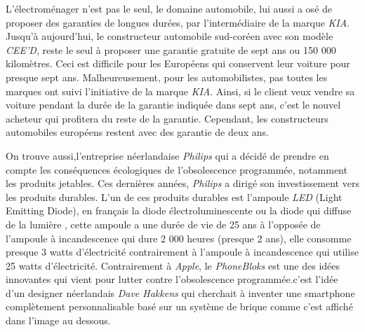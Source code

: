 \smallbreak
L’électroménager n'est pas le seul, le domaine automobile, lui aussi a osé de proposer  des garanties de longues durées, par l’intermédiaire de la marque \textit{KIA}. Jusqu’à aujourd'hui, le constructeur automobile sud-coréen avec son modèle \textit{CEE’D}, reste le seul à proposer une garantie gratuite de sept ans ou 150 000 kilomètres. Ceci est difficile pour les Européens qui conservent leur voiture pour presque sept ans. Malheureusement, pour les automobilistes, pas toutes les marques ont suivi l’initiative de la marque \textit{KIA}. Ainsi, si le client veux vendre sa voiture pendant la durée de la garantie indiquée dans sept ans, c'est le nouvel acheteur qui profitera du reste de la garantie. Cependant, les constructeurs automobiles européens restent avec des garantie de deux ans.


\smallbreak
On trouve aussi,l'entreprise néerlandaise \textit{Philips} qui a décidé de prendre en compte les conséquences écologiques de l'obsolescence programmée, notamment les produits jetables. Ces dernières années, \textit{Philips} a dirigé son investissement vers  les produits durables. L'un de ces produits durables est l’ampoule \textit{LED} (Light Emitting Diode), en français la diode électroluminescente ou la diode qui  diffuse de la lumière , cette ampoule a une durée de vie de 25 ans à l'opposée de l'ampoule à incandescence qui dure 2 000 heures (presque 2 ans), elle consomme presque 3 watts d’électricité contrairement à l'ampoule à incandescence qui utilise 25 watts d’électricité. 
\newpage
\smallbreak
Contrairement à \textit{Apple}, le \textit{PhoneBloks} est une des idées innovantes qui vient pour lutter contre l'obsolescence programmée.c'est l'idée d'un designer néerlandais \textit{Dave Hakkens} qui cherchait à inventer une smartphone complètement personnalisable basé sur un système de brique comme c'est affiché dans l'image au dessous.
